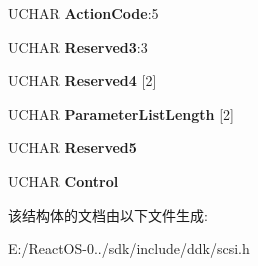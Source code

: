 \begin{DoxyCompactItemize}
U\+C\+H\+AR {\bfseries Action\+Code}\+:5
\item 
\mbox{\label{struct___c_d_b_1_1___s_e_n_d___v_o_l_u_m_e___t_a_g_a2c643878f57d46afd03d99dab13bec04}} 
U\+C\+H\+AR {\bfseries Reserved3}\+:3
\item 
\mbox{\label{struct___c_d_b_1_1___s_e_n_d___v_o_l_u_m_e___t_a_g_a265cdc4710e405c9ed2654c5ef0f779f}} 
U\+C\+H\+AR {\bfseries Reserved4} \mbox{[}2\mbox{]}
\item 
\mbox{\label{struct___c_d_b_1_1___s_e_n_d___v_o_l_u_m_e___t_a_g_a780fc23f60c349efc20d6cd1537ac283}} 
U\+C\+H\+AR {\bfseries Parameter\+List\+Length} \mbox{[}2\mbox{]}
\item 
\mbox{\label{struct___c_d_b_1_1___s_e_n_d___v_o_l_u_m_e___t_a_g_a5f1e59628fc38c9d292cd4e3cce8e1ab}} 
U\+C\+H\+AR {\bfseries Reserved5}
\item 
\mbox{\label{struct___c_d_b_1_1___s_e_n_d___v_o_l_u_m_e___t_a_g_a15f47016a8114690fc890de999e76a64}} 
U\+C\+H\+AR {\bfseries Control}
\end{DoxyCompactItemize}


该结构体的文档由以下文件生成\+:\begin{DoxyCompactItemize}
\item 
E\+:/\+React\+O\+S-\/0../sdk/include/ddk/scsi.\+h\end{DoxyCompactItemize}
